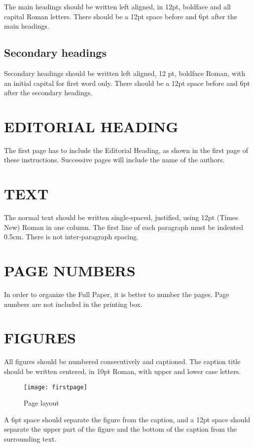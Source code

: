 \documentclass{particles2015}
\begin{document}
The main headings should be written left aligned, in 12pt,
boldface and all capital Roman letters. There should be a 12pt
space before and 6pt after the main headings.

\subsection {Secondary headings}

Secondary headings should be written left aligned, 12 pt, boldface
Roman, with an initial capital for first word only. There should
be a 12pt space before and 6pt after the secondary headings.

\section{EDITORIAL HEADING}

The first page has to include the Editorial Heading, as shown in
the first page of these instructions. Successive pages will
include the name of the authors.

\section{TEXT}

The normal text should be written single-spaced, justified, using
12pt (Times New) Roman in one column. The first line of each
paragraph must be indented 0.5cm. There is not inter-paragraph
spacing.

\section{PAGE NUMBERS}

In order to organize the Full Paper, it is better to number
the pages. Page numbers are not included in the printing box.

\section{FIGURES}

All figures should be numbered consecutively and captioned. The
caption title should be written centered, in 10pt Roman, with
upper and lower case letters.

\begin{figure}[t]
\centering
\texttt{[image: firstpage]}
\caption{Page layout}
\end{figure}

A 6pt space should separate the figure from the caption, and a
12pt space should separate the upper part of the figure and the
bottom of the caption from the surrounding text.
\end{document}
